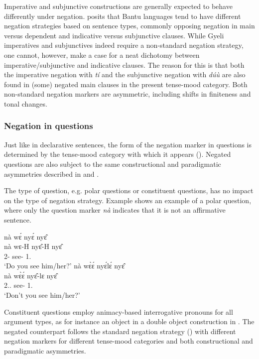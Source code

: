 \documentclass[output=paper,colorlinks=true, citecolor=brown,draftmode]{langscibook}
\begin{document}
Imperative and subjunctive constructions are generally expected to behave differently under negation. \citet{Nurse2008} posits that Bantu languages tend to have different negation strategies based on sentence types, commonly opposing negation in main versus dependent and indicative versus subjunctive clauses. While Gyeli imperatives and subjunctives indeed require a non-standard negation strategy, one cannot, however, make a case for a neat dichotomy between imperative/subjunctive and indicative clauses. The reason for this is that both the imperative negation with {\itshape tí} and the subjunctive negation with {\itshape dúù} are also found in (some) negated main clauses in the present tense-mood category. Both non-standard negation markers  are asymmetric, including shifts in finiteness and tonal changes. 

\subsubsection{Negation in questions}
\label{sec:gye:Q}

Just like in declarative sentences, the form of the negation marker in questions is determined by the tense-mood category with which it appears (). Negated questions are also subject to the same constructional and paradigmatic asymmetries described in  and .  

The type of question, e.g. polar questions or constituent questions, has no impact on the type of negation strategy. Example  shows an example of a polar question, where only the question marker {\itshape nà} indicates that it is not an affirmative sentence.   

\ea\label{PQ1}
\ea\label{PQ1a}
 \glll     nà wɛ́ nyɛ́ nyɛ̂  \\
            nà wɛ-H nyɛ̂-H nyɛ̂ \\
             {\Q} 2{\SG}-{\PRS} see-{\R} 1.{\OBJ}  \\
    \trans `Do you see him/her?'
\ex\label{PQ1b}
\glll    nà wɛ̀ɛ́ nyɛ́lɛ́ nyɛ̂  \\
            nà wɛ̀ɛ́ nyɛ̂-lɛ nyɛ̂ \\
             {\Q} 2{\SG}.{\PRS}.{\NEG} see-{\NEG} 1.{\OBJ}  \\
    \trans `Don't you see him/her?'
\z
\z

Constituent questions employ animacy-based interrogative pronouns for all argument types, as for instance an object in a double object construction in . The negated counterpart follows the standard negation strategy () with different negation markers for different tense-mood categories and both constructional and paradigmatic asymmetries.  
\end{document}
